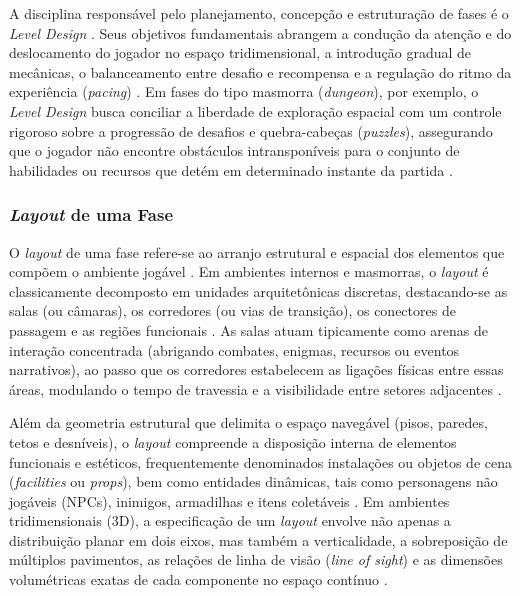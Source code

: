 A disciplina responsável pelo planejamento, concepção e estruturação de fases é o \textit{Level Design} \cite{dormans2010, tanagra, totten2014architectural}. Seus objetivos fundamentais abrangem a condução da atenção e do deslocamento do jogador no espaço tridimensional, a introdução gradual de mecânicas, o balanceamento entre desafio e recompensa e a regulação do ritmo da experiência (\textit{pacing}) \cite{dormans2010, linden2013designing, linden2014dungeons, totten2014architectural}. Em fases do tipo masmorra (\textit{dungeon}), por exemplo, o \textit{Level Design} busca conciliar a liberdade de exploração espacial com um controle rigoroso sobre a progressão de desafios e quebra-cabeças (\textit{puzzles}), assegurando que o jogador não encontre obstáculos intransponíveis para o conjunto de habilidades ou recursos que detém em determinado instante da partida \cite{linden2014dungeons, shaker2016constructive}.

\subsubsection{\textit{Layout} de uma Fase}
\label{sec:layout_fase}

O \textit{layout} de uma fase refere-se ao arranjo estrutural e espacial dos elementos que compõem o ambiente jogável \cite{dormans2010, linden2014dungeons}. Em ambientes internos e masmorras, o \textit{layout} é classicamente decomposto em unidades arquitetônicas discretas, destacando-se as salas (ou câmaras), os corredores (ou vias de transição), os conectores de passagem e as regiões funcionais \cite{linden2014dungeons, shaker2016constructive, xu2025databasedrivenframework3dlevel}. As salas atuam tipicamente como arenas de interação concentrada (abrigando combates, enigmas, recursos ou eventos narrativos), ao passo que os corredores estabelecem as ligações físicas entre essas áreas, modulando o tempo de travessia e a visibilidade entre setores adjacentes \cite{linden2013designing, shaker2016constructive}.

Além da geometria estrutural que delimita o espaço navegável (pisos, paredes, tetos e desníveis), o \textit{layout} compreende a disposição interna de elementos funcionais e estéticos, frequentemente denominados instalações ou objetos de cena (\textit{facilities} ou \textit{props}), bem como entidades dinâmicas, tais como personagens não jogáveis (NPCs), inimigos, armadilhas e itens coletáveis \cite{linden2014dungeons, xu2025constraint}. Em ambientes tridimensionais (3D), a especificação de um \textit{layout} envolve não apenas a distribuição planar em dois eixos, mas também a verticalidade, a sobreposição de múltiplos pavimentos, as relações de linha de visão (\textit{line of sight}) e as dimensões volumétricas exatas de cada componente no espaço contínuo \cite{xu2025constraint, xu2025databasedrivenframework3dlevel}.

